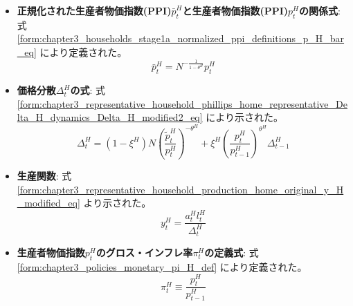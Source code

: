 \begin{itemize}
\begin{equation}
        \label{form:chapter5_two_plane_classification_supply_p_H_bar_eq}
            (\bar{p}_t^H)^{1-\theta^H}=(1-\xi^H)(\widetilde{p}_t^H)^{1-\theta^H}+\xi^H(\bar{p}_{t-1}^H)^{1-\theta^H}
        \end{equation}
    \item
    \label{itm:chapter5_two_plane_classification_supply_p_H_bar_p_H}
        \textbf{正規化された生産者物価指数(PPI)\(\bar{p}_t^H\)と生産者物価指数(PPI)\(p_t^H\)の関係式}:
        式
        \eqref{form:chapter3_households_stage1a_normalized_ppi_definitions_p_H_bar_eq}
        により定義された。
        \begin{equation}
        \label{form:chapter5_two_plane_classification_supply_p_H_bar_p_H_eq}
            \bar{p}_t^H=N^{-\frac{1}{1-\theta^H}}p_t^H
        \end{equation}
    \item
    \label{itm:chapter5_two_plane_classification_supply_Delta_H}
        \textbf{価格分散\(\Delta_t^H\)の式}:
        式
        \eqref{form:chapter3_representative_household_phillips_home_representative_Delta_H_dynamics_Delta_H_modified2_eq}
        により示された。
        \begin{equation}
        \label{form:chapter5_two_plane_classification_supply_Delta_H_eq}
            \Delta_t^H=(1-\xi^H)N\left(\frac{\widetilde{p}_t^H}{p_t^H}\right)^{-\theta^H}+\xi^H\left(\frac{p_t^H}{p_{t-1}^H}\right)^{\theta^H}\Delta_{t-1}^H
        \end{equation}
    \item
    \label{itm:chapter5_two_plane_classification_supply_y_H}
        \textbf{生産関数}:
        式
        \eqref{form:chapter3_representative_household_production_home_original_y_H_modified_eq}
        より示された。
        \begin{equation}
        \label{form:chapter5_two_plane_classification_supply_y_H_eq}
            y_t^H=\frac{a_t^H l_t^H}{\Delta_t^H}
        \end{equation}
    \item
    \label{itm:chapter5_two_plane_classification_external_pi_H}
        \textbf{生産者物価指数\(p_t^H\)のグロス・インフレ率\(\pi_t^H\)の定義式}:
        式
        \eqref{form:chapter3_policies_monetary_pi_H_def}
        により定義された。
        \begin{equation}
        \label{form:chapter5_two_plane_classification_external_pi_H_def}
            \pi_t^H\equiv\frac{p_t^H}{p_{t-1}^H}
        \end{equation}
\end{itemize}

